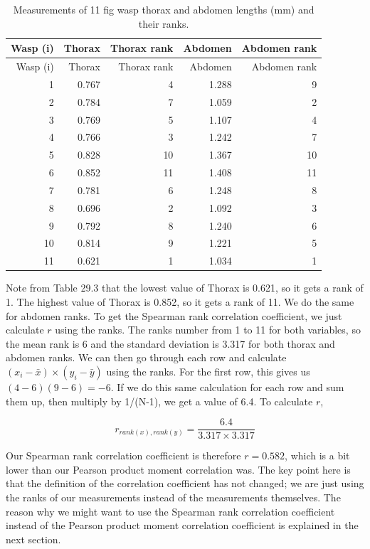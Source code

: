 \documentclass[
]{scrbook}
\begin{document}
\begin{longtable}[]{@{}rrrrr@{}}
\caption{\label{tab:unnamed-chunk-148}Measurements of 11 fig wasp thorax and abdomen lengths (mm) and their ranks.}\tabularnewline
\toprule
Wasp (i) & Thorax & Thorax rank & Abdomen & Abdomen rank \\
\midrule
\endfirsthead
\toprule
Wasp (i) & Thorax & Thorax rank & Abdomen & Abdomen rank \\
\midrule
\endhead
1 & 0.767 & 4 & 1.288 & 9 \\
2 & 0.784 & 7 & 1.059 & 2 \\
3 & 0.769 & 5 & 1.107 & 4 \\
4 & 0.766 & 3 & 1.242 & 7 \\
5 & 0.828 & 10 & 1.367 & 10 \\
6 & 0.852 & 11 & 1.408 & 11 \\
7 & 0.781 & 6 & 1.248 & 8 \\
8 & 0.696 & 2 & 1.092 & 3 \\
9 & 0.792 & 8 & 1.240 & 6 \\
10 & 0.814 & 9 & 1.221 & 5 \\
11 & 0.621 & 1 & 1.034 & 1 \\
\bottomrule
\end{longtable}

Note from Table 29.3 that the lowest value of Thorax is 0.621, so it gets a rank of 1.
The highest value of Thorax is 0.852, so it gets a rank of 11.
We do the same for abdomen ranks.
To get the Spearman rank correlation coefficient, we just calculate \(r\) using the ranks.
The ranks number from 1 to 11 for both variables, so the mean rank is 6 and the standard deviation is 3.317 for both thorax and abdomen ranks.
We can then go through each row and calculate \(\left(x_{i} - \bar{x} \right) \times \left(y_{i} - \bar{y} \right)\) using the ranks.
For the first row, this gives us \(\left(4 - 6 \right) \left(9 - 6 \right) = -6\).
If we do this same calculation for each row and sum them up, then multiply by 1/(N-1), we get a value of 6.4.
To calculate \(r\),

\[r_{rank(x),rank(y)} = \frac{6.4}{3.317 \times 3.317}\]

Our Spearman rank correlation coefficient is therefore \(r = 0.582\), which is a bit lower than our Pearson product moment correlation was.
The key point here is that the definition of the correlation coefficient has not changed; we are just using the ranks of our measurements instead of the measurements themselves.
The reason why we might want to use the Spearman rank correlation coefficient instead of the Pearson product moment correlation coefficient is explained in the next section.
\end{document}
